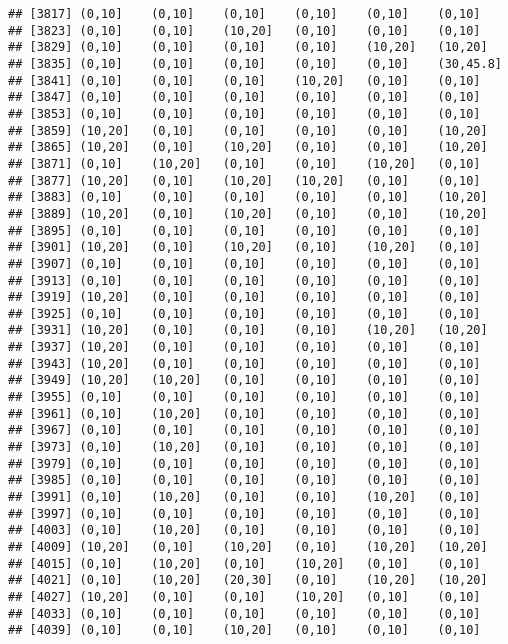 \documentclass[]{article}
\begin{document}
\begin{verbatim}
## [3817] (0,10]    (0,10]    (0,10]    (0,10]    (0,10]    (0,10]   
## [3823] (0,10]    (0,10]    (10,20]   (0,10]    (0,10]    (0,10]   
## [3829] (0,10]    (0,10]    (0,10]    (0,10]    (10,20]   (10,20]  
## [3835] (0,10]    (0,10]    (0,10]    (0,10]    (0,10]    (30,45.8]
## [3841] (0,10]    (0,10]    (0,10]    (10,20]   (0,10]    (0,10]   
## [3847] (0,10]    (0,10]    (0,10]    (0,10]    (0,10]    (0,10]   
## [3853] (0,10]    (0,10]    (0,10]    (0,10]    (0,10]    (0,10]   
## [3859] (10,20]   (0,10]    (0,10]    (0,10]    (0,10]    (10,20]  
## [3865] (10,20]   (0,10]    (10,20]   (0,10]    (0,10]    (10,20]  
## [3871] (0,10]    (10,20]   (0,10]    (0,10]    (10,20]   (0,10]   
## [3877] (10,20]   (0,10]    (10,20]   (10,20]   (0,10]    (0,10]   
## [3883] (0,10]    (0,10]    (0,10]    (0,10]    (0,10]    (10,20]  
## [3889] (10,20]   (0,10]    (10,20]   (0,10]    (0,10]    (10,20]  
## [3895] (0,10]    (0,10]    (0,10]    (0,10]    (0,10]    (0,10]   
## [3901] (10,20]   (0,10]    (10,20]   (0,10]    (10,20]   (0,10]   
## [3907] (0,10]    (0,10]    (0,10]    (0,10]    (0,10]    (0,10]   
## [3913] (0,10]    (0,10]    (0,10]    (0,10]    (0,10]    (0,10]   
## [3919] (10,20]   (0,10]    (0,10]    (0,10]    (0,10]    (0,10]   
## [3925] (0,10]    (0,10]    (0,10]    (0,10]    (0,10]    (0,10]   
## [3931] (10,20]   (0,10]    (0,10]    (0,10]    (10,20]   (10,20]  
## [3937] (10,20]   (0,10]    (0,10]    (0,10]    (0,10]    (0,10]   
## [3943] (10,20]   (0,10]    (0,10]    (0,10]    (0,10]    (0,10]   
## [3949] (10,20]   (10,20]   (0,10]    (0,10]    (0,10]    (0,10]   
## [3955] (0,10]    (0,10]    (0,10]    (0,10]    (0,10]    (0,10]   
## [3961] (0,10]    (10,20]   (0,10]    (0,10]    (0,10]    (0,10]   
## [3967] (0,10]    (0,10]    (0,10]    (0,10]    (0,10]    (0,10]   
## [3973] (0,10]    (10,20]   (0,10]    (0,10]    (0,10]    (0,10]   
## [3979] (0,10]    (0,10]    (0,10]    (0,10]    (0,10]    (0,10]   
## [3985] (0,10]    (0,10]    (0,10]    (0,10]    (0,10]    (0,10]   
## [3991] (0,10]    (10,20]   (0,10]    (0,10]    (10,20]   (0,10]   
## [3997] (0,10]    (0,10]    (0,10]    (0,10]    (0,10]    (0,10]   
## [4003] (0,10]    (10,20]   (0,10]    (0,10]    (0,10]    (0,10]   
## [4009] (10,20]   (0,10]    (10,20]   (0,10]    (10,20]   (10,20]  
## [4015] (0,10]    (10,20]   (0,10]    (10,20]   (0,10]    (0,10]   
## [4021] (0,10]    (10,20]   (20,30]   (0,10]    (10,20]   (10,20]  
## [4027] (10,20]   (0,10]    (0,10]    (10,20]   (0,10]    (0,10]   
## [4033] (0,10]    (0,10]    (0,10]    (0,10]    (0,10]    (0,10]   
## [4039] (0,10]    (0,10]    (10,20]   (0,10]    (0,10]    (0,10]   

\end{verbatim}
\end{document}
